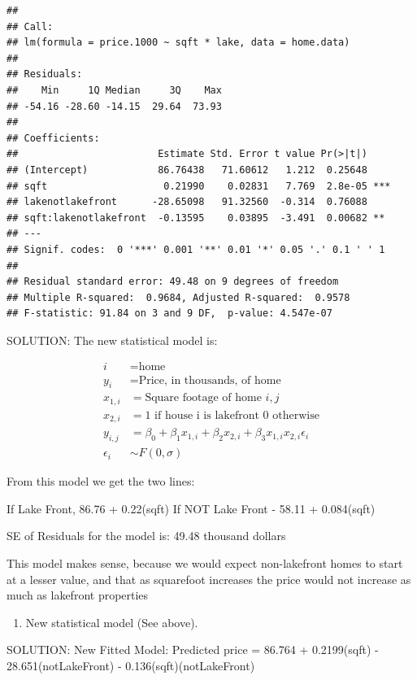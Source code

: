 \documentclass[]{article}
\providecommand{\tightlist}{%
  \setlength{\itemsep}{0pt}\setlength{\parskip}{0pt}}
\begin{document}
\begin{verbatim}
## 
## Call:
## lm(formula = price.1000 ~ sqft * lake, data = home.data)
## 
## Residuals:
##    Min     1Q Median     3Q    Max 
## -54.16 -28.60 -14.15  29.64  73.93 
## 
## Coefficients:
##                        Estimate Std. Error t value Pr(>|t|)    
## (Intercept)            86.76438   71.60612   1.212  0.25648    
## sqft                    0.21990    0.02831   7.769  2.8e-05 ***
## lakenotlakefront      -28.65098   91.32560  -0.314  0.76088    
## sqft:lakenotlakefront  -0.13595    0.03895  -3.491  0.00682 ** 
## ---
## Signif. codes:  0 '***' 0.001 '**' 0.01 '*' 0.05 '.' 0.1 ' ' 1
## 
## Residual standard error: 49.48 on 9 degrees of freedom
## Multiple R-squared:  0.9684, Adjusted R-squared:  0.9578 
## F-statistic: 91.84 on 3 and 9 DF,  p-value: 4.547e-07
\end{verbatim}

SOLUTION: The new statistical model is:

\begin{align*}
i&=\mbox{home}\\
y_{i} & = \mbox{Price, in thousands, of home }\\
x_{1,i} &= \mbox{Square footage of home }i,j\\
x_{2,i} &= 1\mbox{ if house i is lakefront }0 \mbox{ otherwise}\\
y_{i,j} &= \beta_0 + \beta_1 x_{1,i} +\beta_2 x_{2,i} +\beta_3 x_{1,i}x_{2,i}\epsilon_i\\
\epsilon_i &\sim F(0,\sigma)
\end{align*}

From this model we get the two lines:

If Lake Front, 86.76 + 0.22(sqft) If NOT Lake Front - 58.11 +
0.084(sqft)

SE of Residuals for the model is: 49.48 thousand dollars

This model makes sense, because we would expect non-lakefront homes to
start at a lesser value, and that as squarefoot increases the price
would not increase as much as lakefront properties

\begin{enumerate}
\def\labelenumi{\arabic{enumi}.}
\setcounter{enumi}{12}
\tightlist
\item
  New statistical model (See above).
\end{enumerate}

SOLUTION: New Fitted Model: Predicted price = 86.764 + 0.2199(sqft) -
28.651(notLakeFront) - 0.136(sqft)(notLakeFront)
\end{document}

